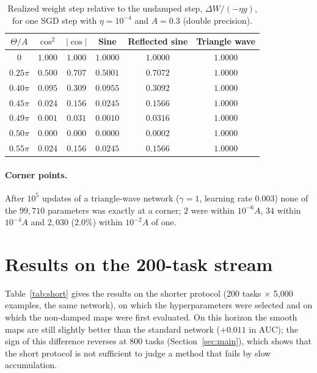 \documentclass[11pt,a4paper]{article}
\begin{document}
\begin{table}[h]
  \centering\small
  \caption{Realized weight step relative to the undamped step, $\Delta W/(-\eta g)$, for one SGD step with
  $\eta=10^{-4}$ and $A=0.3$ (double precision).}
  \label{tab:step}
  \begin{tabular}{@{}cccccc@{}}
    \toprule
    $\Theta/A$ & $\cos^2$ & $|\cos|$ & Sine & Reflected sine & Triangle wave\\
    \midrule
    $0$        & $1.000$ & $1.000$ & $1.0000$ & $1.0000$ & $1.0000$\\
    $0.25\pi$  & $0.500$ & $0.707$ & $0.5001$ & $0.7072$ & $1.0000$\\
    $0.40\pi$  & $0.095$ & $0.309$ & $0.0955$ & $0.3092$ & $1.0000$\\
    $0.45\pi$  & $0.024$ & $0.156$ & $0.0245$ & $0.1566$ & $1.0000$\\
    $0.49\pi$  & $0.001$ & $0.031$ & $0.0010$ & $0.0316$ & $1.0000$\\
    $0.50\pi$  & $0.000$ & $0.000$ & $0.0000$ & $0.0002$ & $1.0000$\\
    $0.55\pi$  & $0.024$ & $0.156$ & $0.0245$ & $0.1566$ & $1.0000$\\
    \bottomrule
  \end{tabular}
\end{table}

\paragraph{Corner points.} After $10^5$ updates of a triangle-wave network ($\gamma=1$, learning rate $0.003$)
none of the $99{,}710$ parameters was exactly at a corner; $2$ were within $10^{-6}A$, $34$ within $10^{-4}A$
and $2{,}030$ ($2.0\%$) within $10^{-2}A$ of one.

\section{Results on the 200-task stream}\label{app:short}

Table~\ref{tab:short} gives the results on the shorter protocol (200 tasks $\times$ 5{,}000 examples, the same
network), on which the hyperparameters were selected and on which the non-damped maps were first evaluated.
On this horizon the smooth maps are still slightly better than the standard network ($+0.011$ in AUC); the
sign of this difference reverses at 800 tasks (Section~\ref{sec:main}), which shows that the short protocol
is not sufficient to judge a method that fails by slow accumulation.
\end{document}
